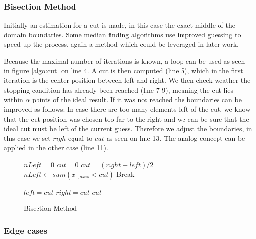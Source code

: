 \documentclass[]{article}
\begin{document}
\subsubsection{Bisection Method}

Initially an estimation for a cut is made, in this case the exact middle of the domain boundaries. Some median finding algorithms use improved guessing to speed up the process, again a method which could be leveraged in later work. 

Because the maximal number of iterations is known, a loop can be used as seen in figure \ref{algo:cut} on line 4. A cut is then computed (line 5), which in the first iteration is the center position between left and right. We then check weather the stopping condition has already been reached (line 7-9), meaning the cut lies within $\alpha$ points of the ideal result. If it was not reached the boundaries can be improved as follows: In case there are too many elements left of the cut, we know that the cut position was chosen too far to the right and we can be sure that the ideal cut must be left of the current guess. Therefore we adjust the boundaries, in this case we set $righ$ equal to $cut$ as seen on line 13. The analog concept can be applied in the other case (line 11). 

\begin{figure}[H]
		\begin{algorithmic}[1]
			\State $nLeft = 0$
			\State $cut = 0$
			\newline
			\State $cut = (right + left ) / 2 $
			\State $nLeft\gets sum(x_{:,axis} < cut)$ 
			\newline
			\State Break 
			\EndIf
			\newline
			
			\State $left = cut$
			\Else 
			\State $right = cut$
			\EndIf
			\newline
			\EndFor
			\State \Return $cut$
			\EndProcedure
		\end{algorithmic}
\caption{Bisection Method}
\label{proc:cut}
\end{figure}


\subsubsection{Edge cases}
\end{document}
